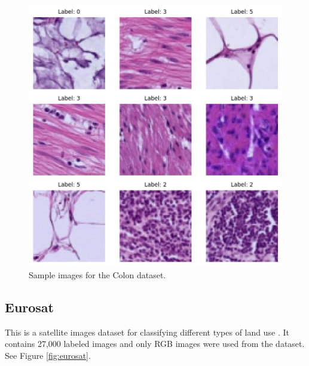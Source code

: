 \documentclass[letterpaper]{article} %
\theoremstyle{plain}
\theoremstyle{definition}
\theoremstyle{remark}
\begin{document}
\begin{figure}[htbp]
    \centering
    \includegraphics[width=\columnwidth]{../../images/colon_1_sample.jpg}
    \caption{Sample images for the Colon dataset.}
    \label{fig:colon}
\end{figure}

\subsection{Eurosat} This is a satellite images dataset for classifying different types of land use \citep{helber2019eurosat}. It contains 27,000 labeled images and only RGB images were used from the dataset. See Figure \ref{fig:eurosat}.
\end{document}
